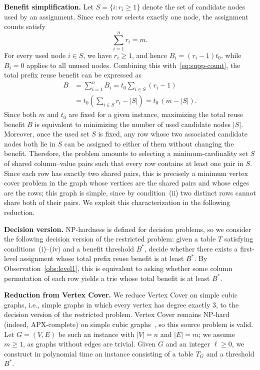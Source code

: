\textbf{Benefit simplification.}
Let $S=\{i:r_i\geq1\}$ denote the set of candidate nodes used by an assignment. Since each row selects exactly one node, the assignment counts satisfy
\begin{equation}
\sum_{i=1}^{n}r_i=m.
\label{eq:supp-count}
\end{equation}
For every used node $i\in S$, we have $r_i\geq1$, and hence $B_i=(r_i-1)t_0$, while $B_i=0$ applies to all unused nodes. Combining this with~\eqref{eq:supp-count}, the total prefix reuse benefit can be expressed as
\begin{equation}
\begin{aligned}
B &=\sum_{i=1}^{n}B_i
=t_0\sum_{i\in S}(r_i-1)\\
&=t_0\left(\sum_{i\in S}r_i-|S|\right)
=t_0\,(m-|S|).
\end{aligned}
\label{eq:supp-benefit}
\end{equation}
Since both $m$ and $t_0$ are fixed for a given instance, maximizing the total reuse benefit $B$ is equivalent to minimizing the number of used candidate nodes $|S|$. Moreover, once the used set $S$ is fixed, any row whose two associated candidate nodes both lie in $S$ can be assigned to either of them without changing the benefit. Therefore, the problem amounts to selecting a minimum-cardinality set $S$ of shared column--value pairs such that every row contains at least one pair in $S$. Since each row has exactly two shared pairs, this is precisely a minimum vertex cover problem in the graph whose vertices are the shared pairs and whose edges are the rows; this graph is simple, since by condition~(ii) two distinct rows cannot share both of their pairs. We exploit this characterization in the following reduction.

\textbf{Decision version.}
NP-hardness is defined for decision problems, so we consider the following decision version of the restricted problem: given a table $T$ satisfying conditions~(i)--(iv) and a benefit threshold $B^{*}$, decide whether there exists a first-level assignment whose total prefix reuse benefit is at least $B^{*}$. By Observation~\ref{obs:level1}, this is equivalent to asking whether some column permutation of each row yields a trie whose total benefit is at least $B^{*}$.

\textbf{Reduction from Vertex Cover.}
We reduce Vertex Cover on simple cubic graphs, i.e., simple graphs in which every vertex has degree exactly $3$, to the decision version of the restricted problem. Vertex Cover remains NP-hard (indeed, APX-complete) on simple cubic graphs~\cite{AlimontiKann2000}, so this source problem is valid. Let $G = (V, E)$ be such an instance with $|V| = n$ and $|E| = m$; we assume $m\geq 1$, as graphs without edges are trivial. Given $G$ and an integer $\ell\geq 0$, we construct in polynomial time an instance consisting of a table $T_G$ and a threshold $B^{*}$.

